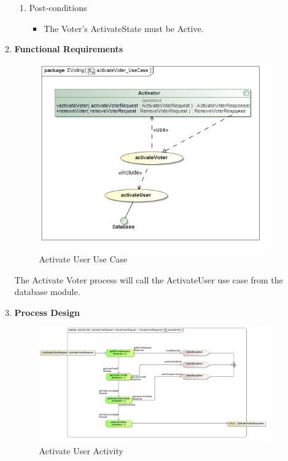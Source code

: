 \begin{enumerate}
\begin{enumerate}
\begin{enumerate}
					\item Post-conditions
					\begin{itemize}
						\item The Voter's ActivateState must be Active.
					\end{itemize}
				\end{enumerate}
			
			\newpage
			
			\item \textbf{Functional Requirements}
				\begin{figure}[H]
					\centering
					\includegraphics[width=0.75\linewidth]{../Images/Activator/UseCase/activateVoter_UseCase.jpg}
					\caption{Activate User Use Case}
				\end{figure}
				
				The Activate Voter process will call the ActivateUser use case from the database module.
				\newline
			
			\item \textbf{Process Design}
				\begin{figure}[H]
					\centering
					\includegraphics[width=0.75\linewidth]{../Images/Activator/Activity/activateVoter.jpg}
					\caption{Activate User Activity}
				\end{figure}
				

\end{enumerate}
\end{enumerate}
